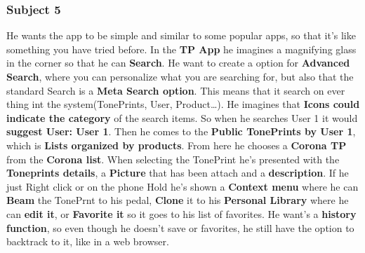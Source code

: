 \subsubsection{Subject 5}
\label{Subject5ICMM}
He wants the app to be simple and similar to some popular apps, so that it’s like something you have tried before. In the \textbf{TP App} he imagines a magnifying glass in the corner so that he can \textbf{Search}. He want to create a option for \textbf{Advanced Search}, where you can personalize what you are searching for, but also that the standard Search is a \textbf{Meta Search option}. This means that it search on ever thing int the system(TonePrints, User, Product…). He imagines that \textbf{Icons could indicate the category} of the search items. So when he searches User 1 it would \textbf{suggest User: User 1}. Then he comes to the \textbf{Public TonePrints by User 1}, which is \textbf{Lists organized by products}. From here he chooses a \textbf{Corona TP} from the \textbf{Corona list}. When selecting the TonePrint he’s presented with the \textbf{Toneprints details}, a \textbf{Picture} that has been attach and a \textbf{description}. If he just Right click or on the phone Hold he’s shown a \textbf{Context menu} where he can \textbf{Beam} the TonePrnt to his pedal, \textbf{Clone} it to his \textbf{Personal Library} where he can \textbf{edit it}, or \textbf{Favorite it} so it goes to his list of favorites. He want’s a \textbf{history function}, so even though he doesn’t save or favorites, he still have the option to backtrack to it, like in a web browser. 


